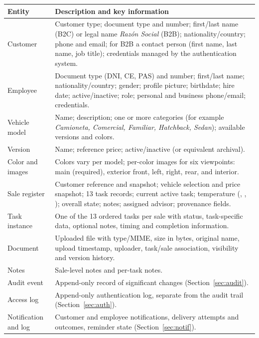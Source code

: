 \documentclass[11pt,a4paper]{article}
\newcommand{\code}[1]{\texttt{\detokenize{#1}}}
\begin{document}
\begin{longtable}{@{}L{3.2cm}L{12.6cm}@{}}
	\toprule
	\textbf{Entity}      & \textbf{Description and key information}
	\\
	\midrule
	\endhead
	Customer             & Customer type; document type and number; first/last
	name (B2C) or legal name \emph{Razón Social} (B2B); nationality/country; phone
	and email; for B2B a contact person (first name, last name, job title);
	credentials managed by the authentication system.
	\\
	Employee             & Document type (DNI, CE, PAS) and number; first/last
	name; nationality/country; gender; profile picture; birthdate; hire date;
	active/inactive; role; personal and business phone/email; credentials.
	\\
	Vehicle model        & Name; description; one or more categories (for example
	\emph{Camioneta, Comercial, Familiar, Hatchback, Sedan}); available versions
	and
	colors.
	\\
	Version              & Name; reference price; active/inactive (or equivalent
	archival).
	\\
	Color and images     & Colors vary per model; per-color images for six
	viewpoints: main (required), exterior front, left, right, rear, and interior.
	\\
	Sale register        & Customer reference and snapshot; vehicle selection and
	price snapshot; 13 task records; current active task; temperature (\code{Hot},
	\code{Warm}, \code{Cold}); overall state; notes; assigned advisor; provenance
	fields.
	\\
	Task instance        & One of the 13 ordered tasks per sale with status,
	task-specific data, optional notes, timing and completion information.
	\\
	Document             & Uploaded file with type/MIME, size in bytes, original
	name, upload
	timestamp, uploader, task/sale association, visibility and version history.
	\\
	Notes                & Sale-level notes and per-task notes.
	\\
	Audit event          & Append-only record of significant changes
	(Section~\ref{sec:audit}).
	\\
	Access log           & Append-only authentication log, separate from the audit
	trail
	(Section~\ref{sec:auth}).
	\\
	Notification and log & Customer and employee notifications, delivery attempts
	and outcomes, reminder state (Section~\ref{sec:notif}).
	\\
	\bottomrule
\end{longtable}
\end{document}
